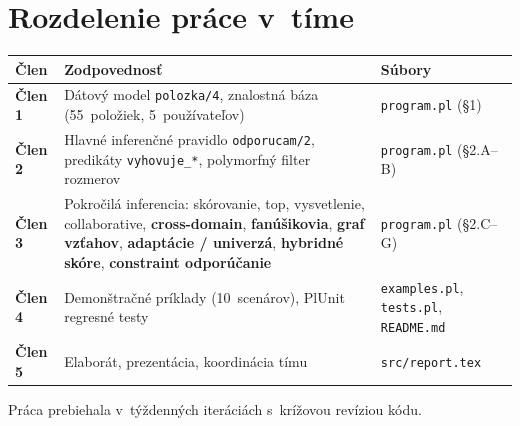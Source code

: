 \documentclass[11pt,a4paper]{article}
\begin{document}
\section{Rozdelenie práce v~tíme}

\begin{center}
\begin{tabular}{>{\bfseries}lp{6cm}l}
\toprule
Člen & Zodpovednosť & Súbory\\
\midrule
Člen 1 & Dátový model \texttt{polozka/4}, znalostná báza
         (55~položiek, 5~používateľov) & \texttt{program.pl} (§1)\\
Člen 2 & Hlavné inferenčné pravidlo \texttt{odporucam/2},
         predikáty \texttt{vyhovuje\_*}, polymorfný filter
         rozmerov & \texttt{program.pl} (§2.A--B)\\
Člen 3 & Pokročilá inferencia: skórovanie, top, vysvetlenie,
         collaborative, \textbf{cross-domain},
         \textbf{fanúšikovia}, \textbf{graf vzťahov},
         \textbf{adaptácie / univerzá}, \textbf{hybridné skóre},
         \textbf{constraint odporúčanie} &
         \texttt{program.pl} (§2.C--G)\\
Člen 4 & Demonštračné príklady (10~scenárov), PlUnit regresné
         testy & \texttt{examples.pl}, \texttt{tests.pl},
         \texttt{README.md}\\
Člen 5 & Elaborát, prezentácia, koordinácia tímu &
         \texttt{src/report.tex}\\
\bottomrule
\end{tabular}
\end{center}

Práca prebiehala v~týždenných iteráciách s~krížovou revíziou kódu.



\end{document}
